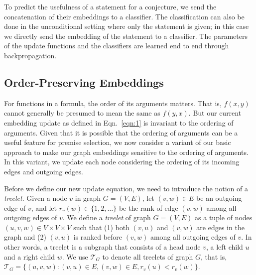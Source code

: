 \documentclass{article}
\begin{document}
To predict the usefulness of a statement for a conjecture, we send the concatenation of
their embeddings to a classifier. The classification can also be done in the
unconditional setting where only the statement is given; in this case we directly
send the embedding of the statement to a classifier. The parameters of the update
functions and the classifiers are learned end to end through
backpropagation. 

\subsection{Order-Preserving Embeddings} \label{sec:ob}
For functions in a formula, the order of its arguments matters. That is,
$f(x,y)$ cannot generally be presumed to mean the same as $f(y,x)$. But our current embedding update as defined in
Eqn.~\ref{eqn:1} is invariant to the ordering of arguments. Given that it is possible that
the ordering of arguments can be a useful feature for premise selection, we now consider
a variant of our basic approach to make our graph embeddings sensitive to the
ordering of arguments. In this variant, we update each node considering the ordering of
its incoming edges and outgoing edges.

Before we define our new update equation, we need to introduce the notion
of a \emph{treelet}. Given a node $v$ in graph $G=(V,E)$, let $(v,w)\in E$ be an outgoing
edge of $v$, and let $r_v(w) \in
\{1,2,\ldots\}$ be the rank of edge $(v,w)$ among all outgoing edges of $v$. We define a
\emph{treelet} of graph $G=(V,E)$ as a tuple of nodes $(u,v,w) \in V\times V\times V$ such
that (1) both $(v,u)$
and $(v,w)$ are edges in the graph and (2) $(v,u)$ is ranked before $(v,w)$ among all outgoing edges of $v$. In other words, a
treelet is a subgraph that consists of a head node $v$, a left child $u$ and a right child $w$.  We use 
$\mathcal{T}_G$ to denote all treelets of graph $G$, that is, $\mathcal{T}_G= \{(u,v,w) :  
(v,u) \in E, (v,w) \in E, r_v(u) < r_v(w)\}$. 
\end{document}
